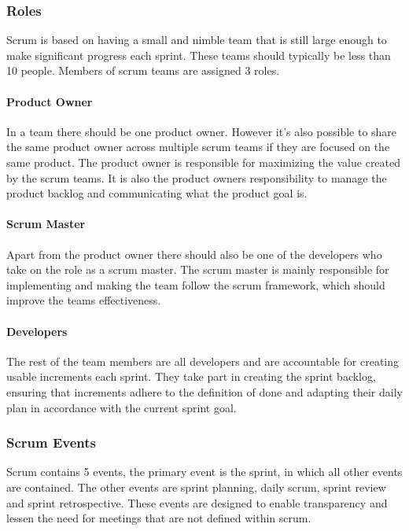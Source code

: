 \subsubsection{Roles}
Scrum is based on having a small and nimble team that is still large enough to make significant progress each sprint. 
These teams should typically be less than 10 people.
Members of scrum teams are assigned 3 roles. \cite{schwaber_sutherland_2022}

\paragraph{Product Owner}
In a team there should be one product owner. However it's also possible to share the same product owner across multiple scrum teams if they are focused on the same product.
The product owner is responsible for maximizing the value created by the scrum teams. It is also the product owners responsibility to manage the product backlog and communicating what the product goal is. \cite{schwaber_sutherland_2022}

\paragraph{Scrum Master}
Apart from the product owner there should also be one of the developers who take on the role as a scrum master.
The scrum master is mainly responsible for implementing and making the team follow the scrum framework, which should improve the teams effectiveness. \cite{schwaber_sutherland_2022}

\paragraph{Developers}
The rest of the team members are all developers and are accountable for creating usable increments each sprint.
They take part in creating the sprint backlog, ensuring that increments adhere to the definition of done and adapting their daily plan in accordance with the current sprint goal. \cite{schwaber_sutherland_2022}

\subsubsection{Scrum Events}
Scrum contains 5 events, the primary event is the sprint, in which all other events are contained. The other events are sprint planning, daily scrum, sprint review and sprint retrospective.
These events are designed to enable transparency and lessen the need for meetings that are not defined within scrum. \cite{schwaber_sutherland_2022}

